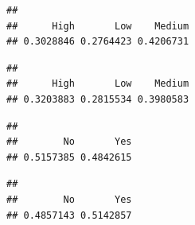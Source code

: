\documentclass[
]{article}
\newenvironment{Shaded}{\begin{snugshade}}{\end{snugshade}}
\newcommand{\FunctionTok}[1]{\textcolor[rgb]{0.13,0.29,0.53}{\textbf{#1}}}
\newcommand{\NormalTok}[1]{#1}
\newcommand{\SpecialCharTok}[1]{\textcolor[rgb]{0.81,0.36,0.00}{\textbf{#1}}}
\begin{document}
\begin{Shaded}
\end{Shaded}

\begin{verbatim}
## 
##      High       Low    Medium 
## 0.3028846 0.2764423 0.4206731
\end{verbatim}

\begin{Shaded}
\end{Shaded}

\begin{verbatim}
## 
##      High       Low    Medium 
## 0.3203883 0.2815534 0.3980583
\end{verbatim}

\begin{Shaded}
\end{Shaded}

\begin{verbatim}
## 
##        No       Yes 
## 0.5157385 0.4842615
\end{verbatim}

\begin{Shaded}
\end{Shaded}

\begin{verbatim}
## 
##        No       Yes 
## 0.4857143 0.5142857
\end{verbatim}
\end{document}
